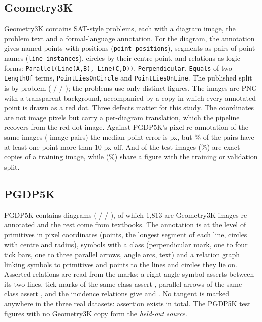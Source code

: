 \subsection{Geometry3K}

Geometry3K \cite{lu2021intergps} contains \nGeometryProblems{} SAT-style problems, each with a diagram image, the problem text and a formal-language annotation. For the diagram, the annotation gives named points with positions (\texttt{point\_positions}), segments as pairs of point names (\texttt{line\_instances}), circles by their centre point, and relations as logic forms: \texttt{Parallel(Line(A,B), Line(C,D))}, \texttt{Perpendicular}, \texttt{Equals} of two \texttt{LengthOf} terms, \texttt{PointLiesOnCircle} and \texttt{PointLiesOnLine}. The published split is by problem (\nGeometryTrainProblems{} / \nGeometryValProblems{} / \nGeometryTestProblems); the \nGeometryProblems{} problems use only \nGeometryFigures{} distinct figures. The images are PNG with a transparent background, accompanied by a copy in which every annotated point is drawn as a red dot. Three defects matter for this study. The coordinates are not image pixels but carry a per-diagram translation, which the pipeline recovers from the red-dot image. Against PGDP5K's pixel re-annotation of the same images (\nCoordPairs{} image pairs) the median point error is \medianCoordErrorPx{} px, but \pctCoordPairsOverTen\% of the pairs have at least one point more than 10 px off. And \nGeometryTestDupTrain{} of the \nGeometryTestImages{} test images (\pctGeometryTestDupTrain\%) are exact copies of a training image, while \nGeometryTestShareFigure{} (\pctGeometryTestShareFigure\%) share a figure with the training or validation split.

\subsection{PGDP5K}

PGDP5K \cite{zhang2022pgdp} contains \nPgdpDiagrams{} diagrams (\nPgdpTrain{} / \nPgdpVal{} / \nPgdpTest), of which 1,813 are Geometry3K images re-annotated and the rest come from textbooks. The annotation is at the level of primitives in pixel coordinates (points, the longest segment of each line, circles with centre and radius), symbols with a class (perpendicular mark, one to four tick bars, one to three parallel arrows, angle arcs, text) and a relation graph linking symbols to primitives and points to the lines and circles they lie on. Asserted relations are read from the marks: a right-angle symbol asserts  between its two lines, tick marks of the same class assert , parallel arrows of the same class assert , and the incidence relations give  and . No tangent is marked anywhere in the three real datasets: \nTangentAssertedAll{} assertion exists in total. The \nHeldoutFigures{} PGDP5K test figures with no Geometry3K copy form the \emph{held-out source}.

